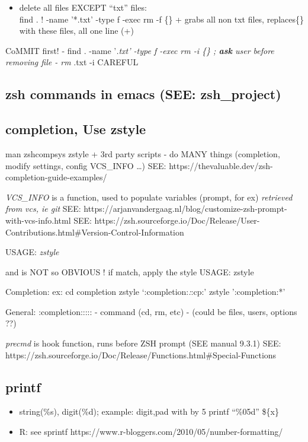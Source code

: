 \documentclass[
]{report}
\providecommand{\tightlist}{%
  \setlength{\itemsep}{0pt}\setlength{\parskip}{0pt}}\usepackage{longtable,booktabs,array}
\begin{document}
\begin{itemize}
\tightlist
\item
  delete all files EXCEPT ``txt'' files:\\
  find . ! -name '*.txt' -type f -exec rm -f \{\} + grabs all non txt
  files, replaces\{\} with these files, all one line (+)
\end{itemize}

CoMMIT first! - find . -name '\emph{.txt' -type f -exec rm -i \{\} ;
\textbf{ask} user before removing file - rm }.txt -i CAREFUL

\subsection{zsh commands in emacs (SEE:
zsh\_project)}\label{zsh-commands-in-emacs-see-zsh_project}

\subsection{completion, Use zstyle}\label{completion-use-zstyle}

man zshcompsys zstyle + 3rd party scripts - do MANY things (completion,
modify settings, config VCS\_INFO \ldots) SEE:
https://thevaluable.dev/zsh-completion-guide-examples/

\emph{VCS\_INFO} is a function, used to populate variables (prompt, for
ex) \emph{retrieved from vcs, ie git} SEE:
https://arjanvandergaag.nl/blog/customize-zsh-prompt-with-vcs-info.html
SEE:
https://zsh.sourceforge.io/Doc/Release/User-Contributions.html\#Version-Control-Information

USAGE: \emph{zstyle}

and is NOT so OBVIOUS ! if match, apply the style USAGE: zstyle

Completion: ex: cd completion zstyle `:completion:\emph{:}:cp:' zstyle
':completion:*'

General: :completion::::: - command (cd, rm, etc) - (could be files,
users, options ??)

\emph{precmd} is hook function, runs before ZSH prompt (SEE manual
9.3.1) SEE:
https://zsh.sourceforge.io/Doc/Release/Functions.html\#Special-Functions

\subsection{printf}\label{printf}

\begin{itemize}
\item
  string(\%s), digit(\%d); example: digit,pad with by 5 printf
  ``\%05d\n'' \$\{x\}
\item
  R: see sprintf https://www.r-bloggers.com/2010/05/number-formatting/
\end{itemize}
\end{document}
